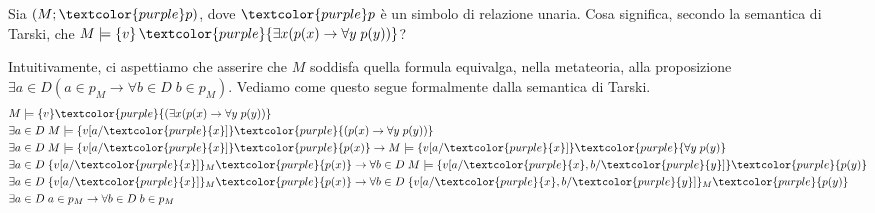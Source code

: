 \begin{example}
    Sia $(M;\textcolor{purple}p)$, dove $\textcolor{purple}p$ è un simbolo di relazione unaria. Cosa significa, secondo la semantica di Tarski, che $M \models \{v\}\,\textcolor{purple}{\exists x(p(x) \to \forall y \; p(y))}$?
\end{example}

\begin{soln}
    Intuitivamente, ci aspettiamo che asserire che $M$ soddisfa quella formula equivalga, nella metateoria, alla proposizione $\exists a \in D(a \in p_M \to \forall b \in D \; b \in p_M)$.
    Vediamo come questo segue formalmente dalla semantica di Tarski.
    \begin{align*}
        & M \models \{v\} \textcolor{purple}{(\exists x(p(x) \to \forall y \; p(y))} \\
        & \exists a \in D \; M \models \{v[a/\textcolor{purple}{x}]\} \textcolor{purple}{(p(x) \to \forall y \; p(y))} \\
        & \exists a \in D \; M \models \{v[a/\textcolor{purple}{x}]\} \textcolor{purple}{p(x)} \to M \models \{v[a/\textcolor{purple}{x}]\} \textcolor{purple}{\forall y \; p(y)} \\
        & \exists a \in D \; \{v[a/\textcolor{purple}{x}]\}_M \textcolor{purple}{p(x)} \to \forall b \in D \; M \models \{v[a/\textcolor{purple}{x},b/\textcolor{purple}{y}]\} \textcolor{purple}{p(y)} \\
        & \exists a \in D \; \{v[a/\textcolor{purple}{x}]\}_M \textcolor{purple}{p(x)} \to \forall b \in D \; \{v[a/\textcolor{purple}{x},b/\textcolor{purple}{y}]\}_M \textcolor{purple}{p(y)} \\
        & \exists a \in D \; a \in p_M \to \forall b \in D \; b \in p_M
    \end{align*}
\end{soln}